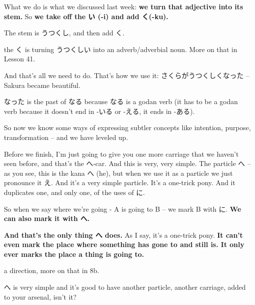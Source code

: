 What we do is what we discussed last week: {\bf we turn that adjective into its stem.} So {\bf we take off the い (-i) and add く(-ku).}

The stem is うつくし, and then add く.

{}

the く is turning うつくしい into an adverb/adverbial noun. More on that in Lesson 41.

{}

And that's all we need to do. That's how we use it: さくらがうつくしくなった -- Sakura became beautiful.

なった is the past of なる because なる is a godan verb (it has to be a godan verb because it doesn't end in -いる or -える, it ends in -ある).

So now we know some ways of expressing subtler concepts like intention, purpose, transformation -- and we have leveled up.

\stopsectionlevel

\stopsectionlevel

\startsectionlevel[title={The へ Particle},reference={the-へ-particle}]

Before we finish, I'm just going to give you one more carriage that we haven't seen before, and that's the へ-car. And this is very, very simple. The particle へ -- as you see, this is the kana へ (he), but when we use it as a particle we just pronounce it え. And it's a very simple particle. It's a one-trick pony. And it duplicates one, and only one, of the uses of に.

So when we say where we're going - A is going to B -- we mark B with に. {\bf We can also mark it with へ.}

{}

{\bf And that's the only thing へ does.} As I say, it's a one-trick pony. {\bf It can't even mark the place where something has gone to and still is. It only ever marks the place a thing is going to.}

a direction, more on that in 8b.

へ is very simple and it's good to have another particle, another carriage, added to your arsenal, isn't it?

\stopsectionlevel

\stopsectionlevel
